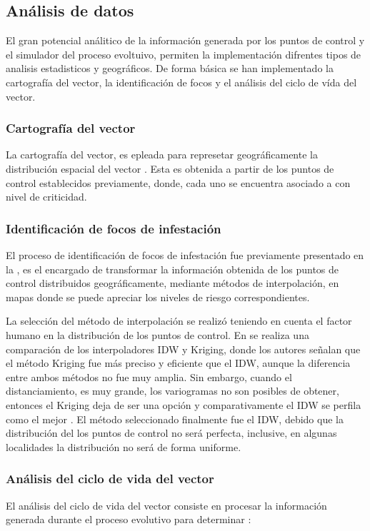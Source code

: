 \subsection{Análisis de datos}
El gran potencial análitico de la información generada por los puntos de control y el simulador
del proceso evoltuivo, permiten la implementación difrentes tipos de analisis estadisticos y
geográficos. De forma básica se han implementado la cartografía del vector, la identificación de
focos y el análisis del ciclo de vída del vector.

\subsubsection{Cartografía del vector}
La cartografía del vector, es epleada para represetar geográficamente la distribución espacial
del vector \citep{vgomesAegis2001}. Esta es obtenida a partir de los puntos de control establecidos
previamente, donde, cada uno se encuentra asociado a con nivel de criticidad.

\subsubsection{Identificación de focos de infestación}
\label{sec:cap5-identificacion-focos}
El proceso de identificación de focos de infestación fue previamente presentado en la
, es el encargado de transformar la información obtenida de
los puntos de control distribuidos geográficamente, mediante métodos de interpolación, en mapas
donde se puede apreciar los niveles de riesgo correspondientes.

La selección del método de interpolación se realizó teniendo en cuenta el factor humano en la
distribución de los puntos de control. En \citet{villatoro2007comparacion} se realiza una
comparación de los interpoladores IDW y Kriging, donde los autores señalan que el método Kriging
fue más preciso y eficiente que el IDW, aunque la diferencia entre ambos métodos no fue muy amplia.
Sin embargo, cuando el distanciamiento, es muy grande, los variogramas no son posibles
de obtener, entonces el Kriging deja de ser una opción y comparativamente el IDW se perfila como
el mejor \citep{villatoro2007comparacion}. El método seleccionado finalmente fue el IDW, debido
que la distribución del los puntos de control no será perfecta, inclusive, en algunas localidades
la distribución no será de forma uniforme.

\subsubsection{Análisis del ciclo de vida del vector}
El análisis del ciclo de vida del vector consiste en procesar la información generada durante el
proceso evolutivo para determinar :

